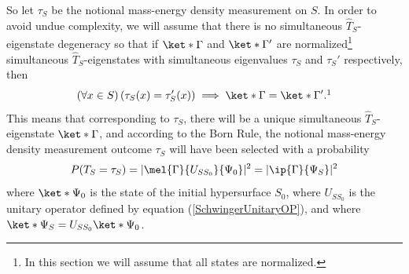 \documentclass[12pt]{report}
\begin{document}
So let $\tau_S$ be the notional mass-energy density measurement on $S$. In order to avoid undue complexity, we will assume that there is no simultaneous $\hat{T}_S$-eigenstate degeneracy so that if $\ket*{\Gamma}$ and $\ket*{\Gamma'}$ are normalized\footnote{In this section we will assume that all states are normalized.} simultaneous $\hat{T}_S$-eigenstates with simultaneous eigenvalues $\tau_S$ and $\tau_S'$ respectively, then
$$(\forall x\in S) \,(\tau_S(x)=\tau_S'(x))\implies \ket*{\Gamma}=\ket*{\Gamma'}.\protect\footnotemark $$This means that corresponding to $\tau_S$, there will be a unique simultaneous $\hat{T}_S$-eigenstate $\ket*{\Gamma}$, and according to the Born Rule, the notional mass-energy density measurement outcome $\tau_S$ will have been selected with a probability 
$$P(T_S = \tau_S)=|\mel{\Gamma}{U_{SS_0}}{\Psi_0}|^2=|\ip{\Gamma}{\Psi_S}|^2$$
where $\ket*{\Psi_0}$ is the state of the initial hypersurface $S_0$, where $U_{SS_0}$ is the unitary operator defined by equation (\ref{SchwingerUnitaryOP}), and where $\ket*{\Psi_S}=U_{SS_0}\ket*{\Psi_0}$.
\end{document}
